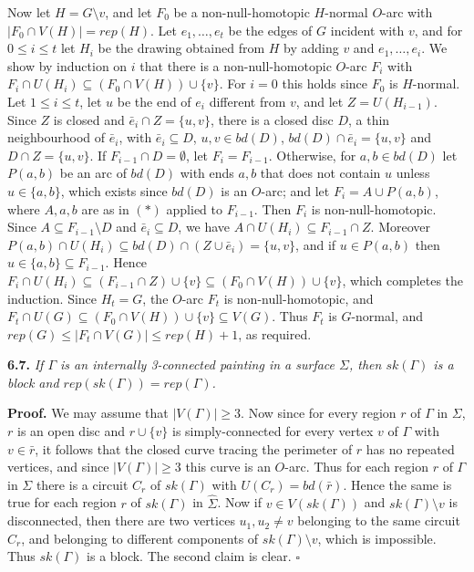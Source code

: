 {Now let $H = G \setminus v$, and let $F_0$ be a non-null-homotopic $H$-normal $O$-arc with $|F_0 \cap V(H)| = rep(H)$. Let $e_1, \dots, e_t$ be the edges of $G$ incident with $v$, and for $0 \le i \le t$ let $H_i$ be the drawing obtained from $H$ by adding $v$ and $e_1, \dots, e_i$. We show by induction on $i$ that there is a non-null-homotopic $O$-arc $F_i$ with $F_i \cap U(H_i) \subseteq (F_0 \cap V(H)) \cup \{v\}$. For $i = 0$ this holds since $F_0$ is $H$-normal. Let $1 \le i \le t$, let $u$ be the end of $e_i$ different from $v$, and let $Z = U(H_{i-1})$. Since $Z$ is closed and $\bar{e}_i \cap Z = \{u, v\}$, there is a closed disc $D$, a thin neighbourhood of $\bar{e}_i$, with $\bar{e}_i \subseteq D$, $u, v \in bd(D)$, $bd(D) \cap \bar{e}_i = \{u, v\}$ and $D \cap Z = \{u, v\}$. If $F_{i-1} \cap D = \emptyset$, let $F_i = F_{i-1}$. Otherwise, for $a, b \in bd(D)$ let $P(a, b)$ be an arc of $bd(D)$ with ends $a, b$ that does not contain $u$ unless $u \in \{a, b\}$, which exists since $bd(D)$ is an $O$-arc; and let $F_i = A \cup P(a, b)$, where $A, a, b$ are as in $(*)$ applied to $F_{i-1}$. Then $F_i$ is non-null-homotopic. Since $A \subseteq F_{i-1} \setminus D$ and $\bar{e}_i \subseteq D$, we have $A \cap U(H_i) \subseteq F_{i-1} \cap Z$. Moreover $P(a, b) \cap U(H_i) \subseteq bd(D) \cap (Z \cup \bar{e}_i) = \{u, v\}$, and if $u \in P(a, b)$ then $u \in \{a, b\} \subseteq F_{i-1}$. Hence $F_i \cap U(H_i) \subseteq (F_{i-1} \cap Z) \cup \{v\} \subseteq (F_0 \cap V(H)) \cup \{v\}$, which completes the induction. Since $H_t = G$, the $O$-arc $F_t$ is non-null-homotopic, and $F_t \cap U(G) \subseteq (F_0 \cap V(H)) \cup \{v\} \subseteq V(G)$. Thus $F_t$ is $G$-normal, and $rep(G) \le |F_t \cap V(G)| \le rep(H) + 1$, as required.}

\textbf{6.7.} \textit{If $\Gamma$ is an internally 3-connected painting in a surface $\Sigma$, then $sk(\Gamma)$ is a block and $rep(sk(\Gamma)) = rep(\Gamma)$.}

\textbf{Proof.} We may assume that $|V(\Gamma)|\ge 3$. Now since for every region $r$ of $\Gamma$ in $\Sigma$, $r$ is an open disc and $r\cup \{v\}$ is simply-connected for every vertex $v$ of $\Gamma$ with $v\in \bar{r}$, it follows that the closed curve tracing the perimeter of $r$ has no repeated vertices, and since $|V(\Gamma)|\ge 3$ this curve is an $O$-arc. Thus for each region $r$ of $\Gamma$ in $\Sigma$ there is a circuit $C_r$ of $sk(\Gamma)$ with $U(C_r) = bd(\bar{r})$. Hence the same is true for each region $r$ of $sk(\Gamma)$ in $\hat{\Sigma}$. Now if $v\in V(sk(\Gamma))$ and $sk(\Gamma)\setminus v$ is disconnected, then there are two vertices $u_1, u_2\ne v$ belonging to the same circuit $C_r$, and belonging to different components of $sk(\Gamma)\setminus v$, which is impossible. Thus $sk(\Gamma)$ is a block. The second claim is clear. $\square$

